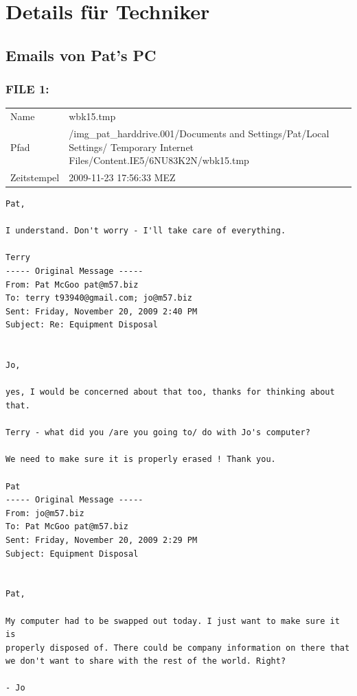 \chapter{Details für Techniker}
\label{sec:details_tec}



\section{Emails von Pat's PC}
\label{sec:pat_emails}

\subsection{FILE 1:}
\label{sec:pat_emails_1}

\begin{table}[htb]
	\begin{tabular}{p{2cm} p{13.5cm}}
		Name & wbk15.tmp\\
		Pfad & /img_pat_harddrive.001/Documents and Settings/Pat/Local Settings/ Temporary Internet Files/Content.IE5/6NU83K2N/wbk15.tmp\\
		Zeitstempel & 2009-11-23 17:56:33 MEZ
	\end{tabular}
\end{table}	

\begin{lstlisting}
Pat,

I understand. Don't worry - I'll take care of everything.

Terry
----- Original Message ----- 
From: Pat McGoo pat@m57.biz
To: terry t93940@gmail.com; jo@m57.biz
Sent: Friday, November 20, 2009 2:40 PM
Subject: Re: Equipment Disposal


Jo,

yes, I would be concerned about that too, thanks for thinking about 
that.

Terry - what did you /are you going to/ do with Jo's computer?

We need to make sure it is properly erased ! Thank you.

Pat
----- Original Message ----- 
From: jo@m57.biz
To: Pat McGoo pat@m57.biz
Sent: Friday, November 20, 2009 2:29 PM
Subject: Equipment Disposal


Pat,

My computer had to be swapped out today. I just want to make sure it is
properly disposed of. There could be company information on there that 
we don't want to share with the rest of the world. Right?

- Jo
\end{lstlisting}

